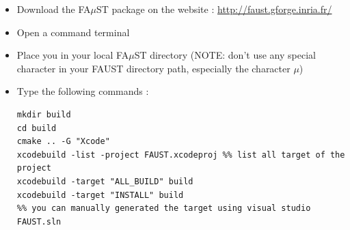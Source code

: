 \begin{itemize}
\item Download the FA$\mu$ST package on the website :  \url{http://faust.gforge.inria.fr/}
\item Open a command terminal
\item Place you in your local FA$\mu$ST directory (NOTE: don't use any special character in your FAUST directory path, especially the character $\mu$)
\item Type the following commands : 
\begin{lstlisting}
mkdir build
cd build
cmake .. -G "Xcode"
xcodebuild -list -project FAUST.xcodeproj %% list all target of the project
xcodebuild -target "ALL_BUILD" build 
xcodebuild -target "INSTALL" build
%% you can manually generated the target using visual studio FAUST.sln
\end{lstlisting}
 
\end{itemize} 
